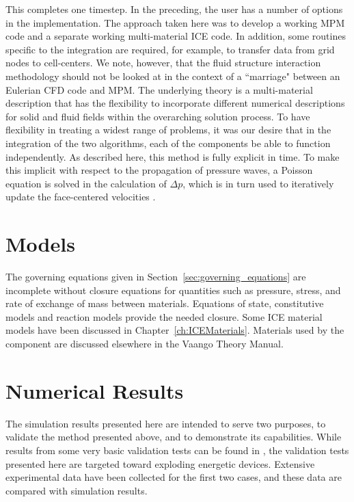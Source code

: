 This completes one timestep.  In the preceding, the user has a number of
options in the implementation.  The approach taken here was to develop a 
working MPM code and a separate working multi-material ICE code.  In 
addition, some routines specific to the integration are required, for 
example, to transfer data from grid nodes to cell-centers.  We 
note, however, that the fluid structure interaction methodology should 
not be looked at in the context of a ``marriage" between an Eulerian CFD 
code and MPM.  The underlying theory is a multi-material description
that has the flexibility to incorporate different numerical descriptions for 
solid and fluid fields within the overarching solution process. 
To have flexibility in treating a widest range of problems, it was our 
desire that in the integration of the two algorithms, each of the components 
be able to function independently.  As described here, this method is fully 
explicit in time.  To make this implicit with respect to the propagation 
of pressure waves, a Poisson equation is solved in the calculation of 
$\Delta p$, which is in turn used to iteratively update the face-centered 
velocities \cite{Kashiwa1994a}.

\section{Models}\label{sec:models}

The governing equations given in Section~\ref{sec:governing_equations} are 
incomplete without closure equations for quantities such as pressure, stress, 
and rate of exchange of mass between materials.  Equations of 
state, constitutive models and reaction models provide
the needed closure.  Some ICE material models have been discussed in
Chapter~\ref{ch:ICEMaterials}.  Materials used by the \MPM component are
discussed elsewhere in the Vaango Theory Manual.

\section{Numerical Results}\label{sec:numerical_results}

  The simulation results presented here are intended to serve two purposes, to 
  validate the method presented above, and to demonstrate its 
  capabilities.  While results from some very basic validation tests can be 
  found in \cite{Guilkey2005}, the validation tests presented here are 
  targeted toward exploding energetic devices.  Extensive experimental data have
  been collected for the first two cases, and these data are compared with 
  simulation results.  
  
